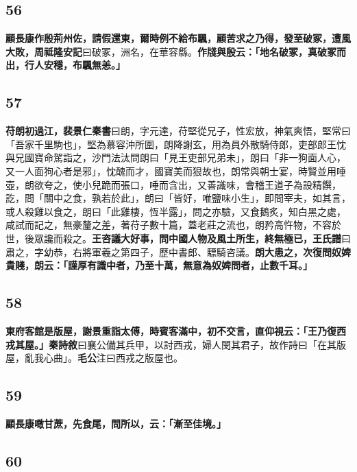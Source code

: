 \subsection*{56}

\textbf{顧長康作殷荊州佐，請假還東，爾時例不給布颿，顧苦求之乃得，發至破冢，遭風大敗，}{\footnotesize \textbf{周祗隆安記}曰破冢，洲名，在華容縣。}\textbf{作牋與殷云：「地名破冢，真破冢而出，行人安穩，布颿無恙。」}

\subsection*{57}

\textbf{苻朗初過江，}{\footnotesize \textbf{裴景仁秦書}曰朗，字元達，苻堅從兄子，性宏放，神氣爽悟，堅常曰「吾家千里駒也」，堅為慕容沖所圍，朗降謝玄，用為員外散騎侍郎，吏部郎王忱與兄國寶命駕詣之，沙門法汰問朗曰「見王吏部兄弟未」，朗曰「非一狗面人心，又一人面狗心者是邪」，忱醜而才，國寶美而狠故也，朗常與朝士宴，時賢並用唾壺，朗欲夸之，使小兒跪而張口，唾而含出，又善識味，會稽王道子為設精饌，訖，問「關中之食，孰若於此」，朗曰「皆好，唯鹽味小生」，即問宰夫，如其言，或人殺雞以食之，朗曰「此雞棲，恆半露」，問之亦驗，又食鵝炙，知白黑之處，咸試而記之，無豪釐之差，著苻子數十篇，蓋老莊之流也，朗矜高忤物，不容於世，後眾讒而殺之。}\textbf{王咨議大好事，問中國人物及風土所生，終無極已，}{\footnotesize \textbf{王氏譜}曰肅之，字幼恭，右將軍羲之第四子，歷中書郎、驃騎咨議。}\textbf{朗大患之，次復問奴婢貴賤，朗云：「謹厚有識中者，乃至十萬，無意為奴婢問者，止數千耳。」}

\subsection*{58}

\textbf{東府客館是版屋，謝景重詣太傅，時賓客滿中，初不交言，直仰視云：「王乃復西戎其屋。」}{\footnotesize \textbf{秦詩敘}曰襄公備其兵甲，以討西戎，婦人閔其君子，故作詩曰「在其版屋，亂我心曲」。\textbf{毛公}注曰西戎之版屋也。}

\subsection*{59}

\textbf{顧長康噉甘蔗，先食尾，問所以，云：「漸至佳境。」}

\subsection*{60}

